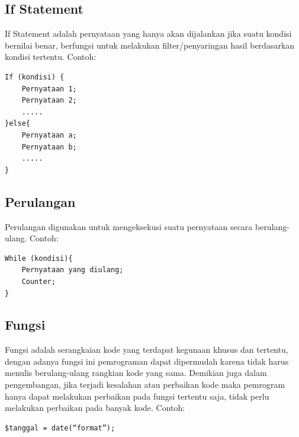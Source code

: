 \subsection{If Statement}
If Statement  adalah pernyataan yang hanya akan dijalankan jika suatu kondisi bernilai benar, berfungsi untuk melakukan filter/penyaringan hasil berdasarkan kondisi tertentu. Contoh:
\begin{lstlisting}
If (kondisi) {
    Pernyataan 1;
    Pernyataan 2;
    .....
}else{
    Pernyataan a;
    Pernyataan b;
    .....
}
\end{lstlisting}
\subsection{Perulangan}
Perulangan digunakan untuk mengeksekusi suatu pernyataan secara berulang-ulang. Contoh:
\begin{lstlisting}
While (kondisi){
    Pernyataan yang diulang;
    Counter;
}
\end{lstlisting}
\subsection{Fungsi}
Fungsi adalah serangkaian kode yang terdapat kegunaan khusus dan tertentu, dengan adanya fungsi ini pemrograman dapat dipermudah karena tidak harus menulis berulang-ulang rangkian kode yang sama. Demikian juga dalam pengembangan, jika terjadi kesalahan atau perbaikan kode maka pemrogram hanya dapat melakukan perbaikan pada fungsi tertentu saja, tidak perlu melakukan perbaikan pada banyak kode. Contoh:
\begin{lstlisting}
$tanggal = date(“format”);
\end{lstlisting}


